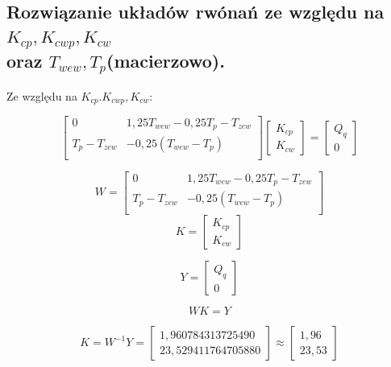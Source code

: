 \documentclass{article}
\begin{document}
\begin{flushleft}
\section{Rozwiązanie układów rwónań ze względu na $K_{cp}, K_{cwp}, K_{cw}$ \\oraz $T_{wew}, T_{p}$(macierzowo).}
\end{flushleft}

\begin{flushleft}
Ze względu na $K_{cp}. K_{cwp}, K_{cw}$:
\end{flushleft}
$$
\begin{bmatrix}
        0 & 1,25T_{wew}-0,25T_{p}-T_{zew}            \\[0.3em]
        T_{p}-T_{zew} & -0,25(T_{wew}-T_{p})            \\[0.3em]
    \end{bmatrix}
    \begin{bmatrix}
        K_{cp}\\
        K_{cw}
    \end{bmatrix}
    =
    \begin{bmatrix}
        Q_{q}\\
        0
    \end{bmatrix}
$$

$$
W=
\begin{bmatrix}
        0 & 1,25T_{wew}-0,25T_{p}-T_{zew}            \\[0.3em]
        T_{p}-T_{zew} & -0,25(T_{wew}-T_{p})            \\[0.3em]
    \end{bmatrix}
$$
$$
K=
\begin{bmatrix}
        K_{cp}\\
        K_{cw}
    \end{bmatrix}
$$

$$
Y=\begin{bmatrix}
        Q_{q}\\
        0
    \end{bmatrix}
$$

$$
WK=Y
$$

$$
K=W^{-1}Y=
\begin{bmatrix}
        1,960784313725490\\
        23,529411764705880
\end{bmatrix}\approx 
\begin{bmatrix}
        1,96 \\
        23,53
\end{bmatrix}
$$
\end{document}
